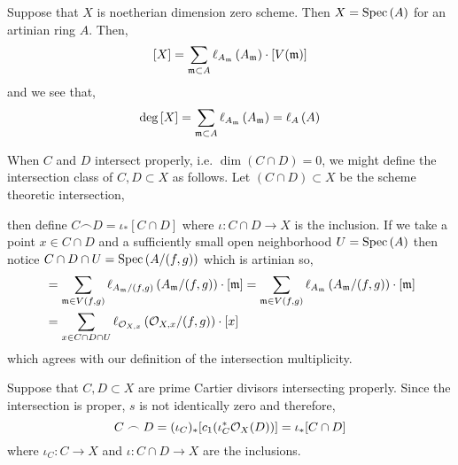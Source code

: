 \documentclass[12pt]{article}
\begin{document}
\begin{example}
Suppose that $X$ is noetherian dimension zero scheme. Then $X = \mathrm{Spec}\left( A \right)$ for an artinian ring $A$. Then,
\[ [X] = \sum_{\mathfrak{m} \subset A}  \ell_{A_{\mathfrak{m}}} \left( A_{\mathfrak{m}} \right) \cdot [V(\mathfrak{m})] \]
and we see that,
\[ \deg{[X]} = \sum_{\mathfrak{m} \subset A} \ell_{A_{\mathfrak{m}}} \left( A_{\mathfrak{m}} \right) = \ell_{A} \left( A \right) \]
\end{example}


\begin{rmk}
When $C$ and $D$ intersect properly, i.e. $\dim{(C \cap D)} = 0$, we might define the intersection class of $C, D \subset X$ as follows. Let $(C \cap D) \subset X$ be the scheme theoretic intersection,
\begin{center}
\end{center}
then define $C \frown D = \iota_* [C \cap D]$ where $\iota : C \cap D \to X$ is the inclusion. If we take a point $x \in C \cap D$ and a sufficiently small open neighborhood $U = \mathrm{Spec}\left( A \right)$ then notice $C \cap D \cap U = \mathrm{Spec}\left( A / (f, g) \right)$ which is artinian so,
\begin{align*}
[C \cap D \cap U] & = \sum_{\m \in V(f, g)} \ell_{A_\m / (f, g)} \left( A_\m / (f, g) \right) \cdot [\m] = \sum_{\m \in V(f, g)} \ell_{A_\m} \left( A_\m /(f, g) \right) \cdot [\m] 
\\
& = \sum_{x \in C \cap D \cap U} \ell_{\stalk{X}{x}} \left( \stalk{X}{x} / (f, g) \right) \cdot [x] 
\end{align*}
which agrees with our definition of the intersection multiplicity.
\end{rmk}

\begin{prop}
Suppose that $C, D \subset X$ are prime Cartier divisors intersecting properly. Since the intersection is proper, $s$ is not identically zero and therefore,
\[ C \frown D = (\iota_C)_* [c_1( \iota^*_C \mathcal{O}_{X}(D))] = \iota_* [C \cap D] \]
where $\iota_C : C \to X$ and $\iota : C \cap D \to X$ are the inclusions.
\end{prop}
\end{document}
